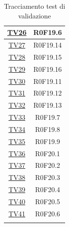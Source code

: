 \documentclass[../PianoDiQualifica.tex]{subfiles}
\begin{document}
\begin{longtable}{|c|c|}
	\hline
	\hyperlink{TV26}{TV26} & R0F19.6   \\
	\hline
	\hyperlink{TV27}{TV27} & R0F19.14   \\
	\hline
	\hyperlink{TV28}{TV28} & R0F19.15   \\
	\hline
	\hyperlink{TV29}{TV29} & R0F19.16   \\
	\hline
	\hyperlink{TV30}{TV30} & R0F19.11   \\
	\hline
	\hyperlink{TV31}{TV31} & R0F19.12   \\
	\hline
	\hyperlink{TV32}{TV32} & R0F19.13   \\
	\hline
	\hyperlink{TV33}{TV33} & R0F19.7   \\
	\hline
	\hyperlink{TV34}{TV34} & R0F19.8   \\
	\hline
	\hyperlink{TV35}{TV35} & R0F19.9   \\
	\hline
	\hyperlink{TV36}{TV36} & R0F20.1   \\
	\hline
	\hyperlink{TV37}{TV37} & R0F20.2   \\
	\hline
	\hyperlink{TV38}{TV38} & R0F20.3   \\
	\hline
	\hyperlink{TV39}{TV39} & R0F20.4   \\
	\hline
	\hyperlink{TV40}{TV40} & R0F20.5   \\
	\hline
	\hyperlink{TV41}{TV41} & R0F20.6  \\
	\hline
	\caption[Tracciamento test di validazione]{Tracciamento test di validazione}
	\label{tabella:TracciamentoTestValidazione}
\end{longtable}
	
\newpage
\end{document}
